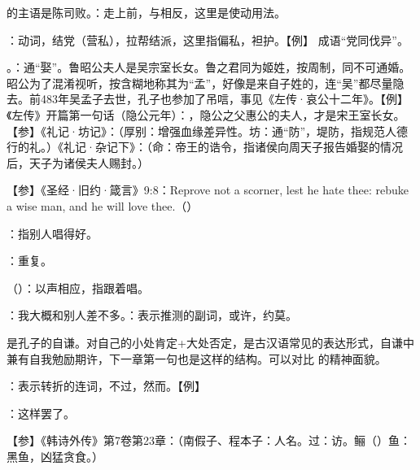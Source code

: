 {\begin{lyitemize}
\item {}的主语是陈司败。：走上前，与相反，这里是使动用法。

\item {}：动词，结党（营私），拉帮结派，这里指偏私，袒护。【例】 成语“党同伐异”。

\item {}。：通“娶”。鲁昭公夫人是吴宗室长女。鲁之君同为姬姓，按周制，同不可通婚。昭公为了混淆视听，按含糊地称其为“孟”，好像是来自子姓的，连“吴”都尽量隐去。前483年吴孟子去世，孔子也参加了吊唁，事见《左传·哀公十二年》。【例】《左传》开篇第一句话（隐公元年）：，隐公之父惠公的夫人，才是宋王室长女。【参】《礼记·坊记》：（厚别：增强血缘差异性。坊：通“防”，堤防，指规范人德行的礼。）《礼记·杂记下》：（命：帝王的诰令，指诸侯向周天子报告婚娶的情况后，天子为诸侯夫人赐封。）
\end{lyitemize}
【参】《圣经·旧约·箴言》9:8：Reprove not a scorner, lest he hate thee: rebuke a wise man, and he will love thee.（）
}
{}


{
\item {}：指别人唱得好。
\item {}：重复。
\item {}（）：以声相应，指跟着唱。
}
{}


{
\item {}：我大概和别人差不多。：表示推测的副词，或许，约莫。
\item {}是孔子的自谦。对自己的小处肯定+大处否定，是古汉语常见的表达形式，自谦中兼有自我勉励期许，下一章第一句也是这样的结构。可以对比  的精神面貌。
}
{}


{
\begin{lyitemize}
\item {}：表示转折的连词，不过，然而。【例】 
\item {}：这样罢了。
\end{lyitemize}
【参】《韩诗外传》第7卷第23章：（南假子、程本子：人名。过：访。鲡（）鱼：黑鱼，凶猛贪食。） %
}
{}


